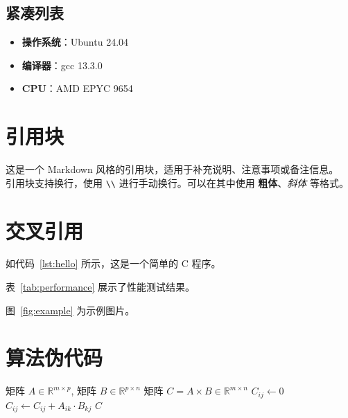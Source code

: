 \subsection{紧凑列表}

\begingroup
{}
\begin{itemize}
    \setlength{\itemsep}{0pt}
    \setlength{\parsep}{0pt}
    \setlength{\parskip}{0pt}
    \setlength{\topsep}{0pt}
    \item \textbf{操作系统}：Ubuntu 24.04
    \item \textbf{编译器}：gcc 13.3.0
    \item \textbf{CPU}：AMD EPYC 9654
\end{itemize}
\endgroup

\section{引用块}

\begin{mdquote}
这是一个 Markdown 风格的引用块，适用于补充说明、注意事项或备注信息。\\

引用块支持换行，使用 \texttt{\textbackslash\textbackslash} 进行手动换行。可以在其中使用
\textbf{粗体}、\textit{斜体} 等格式。
\end{mdquote}

\section{交叉引用}

如代码~\ref{lst:hello} 所示，这是一个简单的 C 程序。

表~\ref{tab:performance} 展示了性能测试结果。

图~\ref{fig:example} 为示例图片。

\section{算法伪代码}

\begin{algorithm}[H]
    \caption{矩阵乘法朴素算法}
    \label{alg:matmul}
    \begin{algorithmic}[1]
        \REQUIRE 矩阵 $A \in \mathbb{R}^{m \times p}$, 矩阵 $B \in \mathbb{R}^{p \times n}$
        \ENSURE 矩阵 $C = A \times B \in \mathbb{R}^{m \times n}$
                \STATE $C_{ij} \leftarrow 0$
                    \STATE $C_{ij} \leftarrow C_{ij} + A_{ik} \cdot B_{kj}$
                \ENDFOR
            \ENDFOR
        \ENDFOR
        \RETURN $C$
    \end{algorithmic}
\end{algorithm}

